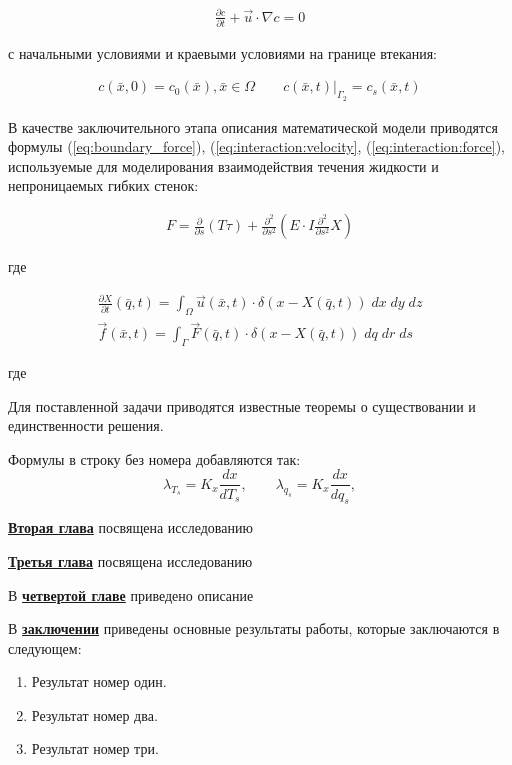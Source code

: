 \begin{gather}
    \label{eq:convection}
    \frac{\partial c}{\partial t} + \vec{u} \cdot \nabla c = 0
\end{gather}

с начальными условиями и краевыми условиями на границе втекания:

\begin{gather}
    \label{eq:convection:conditions}
    c(\bar{x}, 0) = c_0(\bar{x}), \bar{x} \in \Omega \qquad c(\bar{x}, t)|_{\Gamma_2} = c_s(\bar{x}, t)
\end{gather}

В качестве заключительного этапа описания математической модели приводятся формулы (\ref{eq:boundary_force}), (\ref{eq:interaction:velocity}, (\ref{eq:interaction:force}), используемые для моделирования взаимодействия течения жидкости и непроницаемых гибких стенок:

\begin{gather}
    \label{eq:boundary_force}
    F = \frac{\partial}{\partial s} (T \tau) + \frac{\partial^2}{\partial s^2} (E \cdot I \frac{\partial^2}{\partial s^2} X)
\end{gather}

где 

\begin{gather}
    \label{eq:interaction:velocity}
    \frac{\partial X}{\partial t}(\bar{q}, t) = \int_{\Omega} \vec{u}(\bar{x}, t) \cdot \delta (x - X(\bar{q}, t))\; dx\; dy\; dz\\
    \label{eq:interaction:force}
    \vec{f}(\bar{x}, t) = \int_{\Gamma} \vec{F}(\bar{q}, t) \cdot \delta (x - X(\bar{q}, t))\; dq\; dr\; ds
\end{gather}

где


Для поставленной задачи приводятся известные теоремы о существовании и единственности решения.

Формулы в строку без номера добавляются так:
$$
  \lambda_{T_s} = K_x\frac{d{x}}{d{T_s}}, \qquad
  \lambda_{q_s} = K_x\frac{d{x}}{d{q_s}},
$$

\underline{\textbf{Вторая глава}} посвящена исследованию 

\underline{\textbf{Третья глава}} посвящена исследованию 

В \underline{\textbf{четвертой главе}} приведено описание 

В \underline{\textbf{заключении}} приведены основные результаты работы, которые заключаются в следующем:
\begin{enumerate}
 \item Результат номер один.
 \item Результат номер два.
 \item Результат номер три.
\end{enumerate}


\renewcommand{\refname}{\Large Публикации автора по теме диссертации}
\nocite{*}

